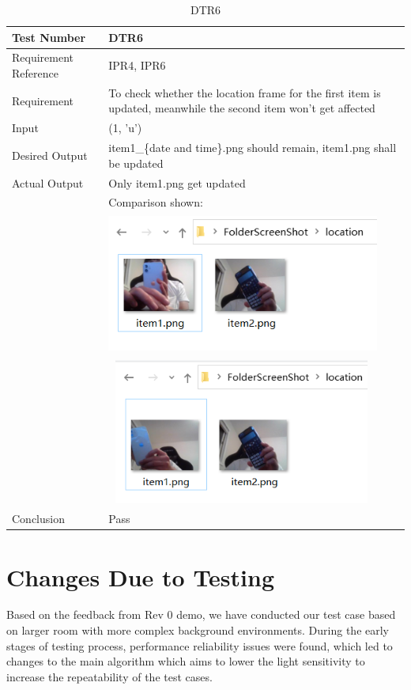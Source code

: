 \documentclass[12pt, titlepage]{article}
\begin{document}
\begin{table}[H]
\begin{center}
\begin{tabular}{|l | m{9cm}|}
\hline
  Test Number & DTR6\\
  \hline
  Requirement Reference & IPR4, IPR6\\
  \hline
  Requirement &  To check whether the location frame for the first item is updated, meanwhile the second item won't get affected\\
  \hline
  Input & (1, 'u')\\
  \hline
  Desired Output & item1\_\{date and time\}.png should remain, item1.png shall be updated\\
  \hline
  Actual Output & Only item1.png get updated\\&Comparison shown:\\&\includegraphics[width=90mm, height=46mm]{UT41.png}\\&\includegraphics[width=89mm, height=48mm]{UT42.png}\\
  \hline
  Conclusion & Pass\\
  \hline
\end{tabular}
\end{center} 
\caption{DTR6}
\end{table}

\section{Changes Due to Testing}
Based on the feedback from Rev 0 demo, we have conducted our test case based on larger room with more complex background environments. During the early stages of testing process, performance reliability issues were found, which led to changes to the main algorithm which aims to lower the light sensitivity to increase the repeatability of the test cases.  \\
 
\end{document}
